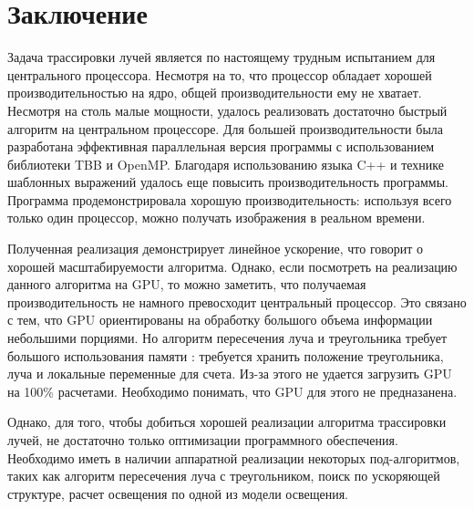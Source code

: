 \documentclass[12pt, a4paper, utf8]{article}
\begin{document}


\newpage
\section*{Заключение}
Задача трассировки лучей является по настоящему трудным испытанием для центрального процессора. Несмотря на то, что процессор обладает хорошей производительностью на ядро, общей производительности ему не хватает. Несмотря на столь малые мощности, удалось реализовать достаточно быстрый алгоритм на центральном процессоре. Для большей производительности была разработана эффективная параллельная версия программы с использованием библиотеки TBB и OpenMP. Благодаря использованию языка C++ и технике шаблонных выражений удалось еще повысить производительность программы. Программа продемонстрировала хорошую производительность: используя всего только один процессор, можно получать изображения в реальном времени.

Полученная реализация демонстрирует линейное ускорение, что говорит о хорошей масштабируемости алгоритма. Однако, если посмотреть на реализацию данного алгоритма на GPU, то можно заметить, что получаемая производительность не намного превосходит центральный процессор. Это связано с тем, что GPU ориентированы на обработку большого объема информации небольшими порциями. Но алгоритм пересечения луча и треугольника требует большого использования памяти : требуется хранить положение треугольника, луча и локальные переменные для счета. Из-за этого не удается загрузить GPU на 100\% расчетами. Необходимо понимать, что GPU для этого не предназанена.

Однако, для того, чтобы добиться хорошей реализации алгоритма трассировки лучей, не достаточно только оптимизации программного обеспечения. Необходимо иметь в наличии аппаратной реализации некоторых под-алгоритмов, таких как алгоритм пересечения луча с треугольником, поиск по ускоряющей структуре, расчет освещения по одной из модели освещения.

\end{document}
